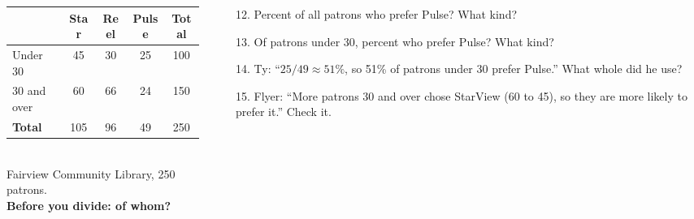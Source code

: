 \documentclass[aspectratio=169, 11pt]{beamer}
\begin{document}
\begin{frame}[t, plain]
  \begin{columns}[t]
    \begin{column}{0.5\textwidth}
      {\small\renewcommand{\arraystretch}{1.3}%
      \begin{tabular}{l c c c c}
      \hline
       & \textbf{Star} & \textbf{Reel} & \textbf{Pulse} & \textbf{Total} \\
      \hline
      Under 30 & 45 & 30 & 25 & 100 \\
      30 and over & 60 & 66 & 24 & 150 \\
      \textbf{Total} & 105 & 96 & 49 & 250 \\
      \hline
      \end{tabular}}\\[6pt]
      {\footnotesize Fairview Community Library, 250 patrons.}\\[8pt]
      {\color{cerulean}\bfseries Before you divide: of whom?}
    \end{column}
    \begin{column}{0.46\textwidth}
      {\small
      \begin{itemize}\setlength{\itemsep}{3pt}
        \item[12.] Percent of all patrons who prefer Pulse? What kind?
        \item[13.] Of patrons under 30, percent who prefer Pulse? What kind?
        \item[14.] Ty: ``$25/49 \approx 51\%$, so 51\% of patrons under 30 prefer Pulse.'' What
              whole did he use?
        \item[15.] Flyer: ``More patrons 30 and over chose StarView (60 to 45), so they are more
              likely to prefer it.'' Check it.
      \end{itemize}}
    \end{column}
  \end{columns}
\end{frame}
\end{document}
